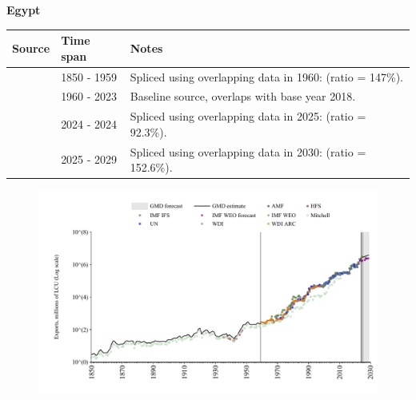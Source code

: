 \documentclass[12pt,a4paper,landscape]{article}
\begin{document}
\begin{adjustbox}{max totalsize={\paperwidth}{\paperheight},center}
\begin{minipage}[t][\textheight][t]{\textwidth}
\vspace*{0.5cm}
{}
\begin{center}
{\Large\bfseries Egypt}
\end{center}
\vspace{0.5cm}
\begin{table}[H]
\centering
\small
\begin{tabular}{|l|l|l|}
\hline
\textbf{Source} & \textbf{Time span} & \textbf{Notes} \\
\hline
\rowcolor{white}\cite{Mitchell}& 1850 - 1959 &Spliced using overlapping data in 1960: (ratio = 147\%).\\
\rowcolor{lightgray}\cite{WDI}& 1960 - 2023 &Baseline source, overlaps with base year 2018.\\
\rowcolor{white}\cite{IMF_IFS}& 2024 - 2024 &Spliced using overlapping data in 2025: (ratio = 92.3\%).\\
\rowcolor{lightgray}\cite{IMF_WEO_forecast}& 2025 - 2029 &Spliced using overlapping data in 2030: (ratio = 152.6\%).\\
\hline
\end{tabular}
\end{table}
\begin{figure}[H]
\centering
\includegraphics[width=\textwidth,height=0.6\textheight,keepaspectratio]{graphs/EGY_exports.pdf}
\end{figure}
\end{minipage}
\end{adjustbox}
\end{document}
